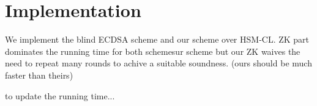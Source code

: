 \documentclass[runningheads]{llncs}
\newcommand{\pk}{{\sf pk}}
\newcommand{\PK}{{\sf PK}}
\begin{document}
%			
%			
%			
%			
%			
%			
%			
%


		\section{Implementation}
	We implement the blind ECDSA scheme and our scheme over HSM-CL. ZK part dominates the running time for both schemesur scheme but our ZK waives the need to repeat many rounds to achive a suitable soundness. (ours should be much faster than theirs)
	
	
	to update the running time...
	
	
	
	
\end{document}
